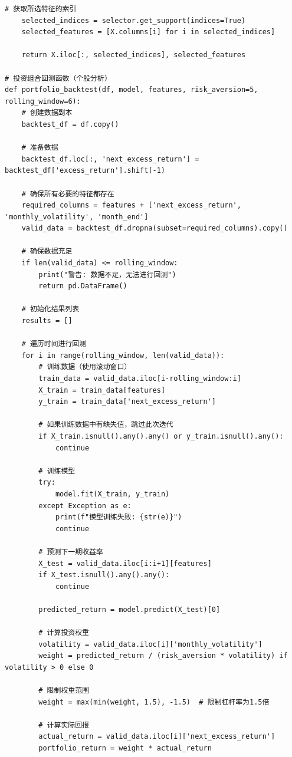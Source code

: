 \documentclass[12pt, a4paper]{article}
\begin{document}
\begin{lstlisting}[basicstyle=\small\ttfamily, breaklines=true, columns=fullflexible]
    # 获取所选特征的索引
    selected_indices = selector.get_support(indices=True)
    selected_features = [X.columns[i] for i in selected_indices]
    
    return X.iloc[:, selected_indices], selected_features

# 投资组合回测函数（个股分析）
def portfolio_backtest(df, model, features, risk_aversion=5, rolling_window=6):
    # 创建数据副本
    backtest_df = df.copy()
    
    # 准备数据
    backtest_df.loc[:, 'next_excess_return'] = backtest_df['excess_return'].shift(-1)
    
    # 确保所有必要的特征都存在
    required_columns = features + ['next_excess_return', 'monthly_volatility', 'month_end']
    valid_data = backtest_df.dropna(subset=required_columns).copy()
    
    # 确保数据充足
    if len(valid_data) <= rolling_window:
        print("警告: 数据不足，无法进行回测")
        return pd.DataFrame()
    
    # 初始化结果列表
    results = []
    
    # 遍历时间进行回测
    for i in range(rolling_window, len(valid_data)):
        # 训练数据（使用滚动窗口）
        train_data = valid_data.iloc[i-rolling_window:i]
        X_train = train_data[features]
        y_train = train_data['next_excess_return']
        
        # 如果训练数据中有缺失值，跳过此次迭代
        if X_train.isnull().any().any() or y_train.isnull().any():
            continue
        
        # 训练模型
        try:
            model.fit(X_train, y_train)
        except Exception as e:
            print(f"模型训练失败: {str(e)}")
            continue
        
        # 预测下一期收益率
        X_test = valid_data.iloc[i:i+1][features]
        if X_test.isnull().any().any():
            continue
            
        predicted_return = model.predict(X_test)[0]
        
        # 计算投资权重
        volatility = valid_data.iloc[i]['monthly_volatility']
        weight = predicted_return / (risk_aversion * volatility) if volatility > 0 else 0
        
        # 限制权重范围
        weight = max(min(weight, 1.5), -1.5)  # 限制杠杆率为1.5倍
        
        # 计算实际回报
        actual_return = valid_data.iloc[i]['next_excess_return']
        portfolio_return = weight * actual_return
        

\end{lstlisting}
\end{document}
